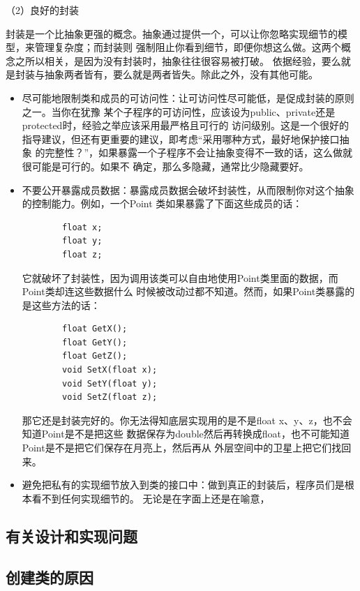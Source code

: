 \documentclass{article}
\begin{document}
\par
（2）良好的封装
\par
封装是一个比抽象更强的概念。抽象通过提供一个，可以让你忽略实现细节的模型，来管理复杂度；而封装则
强制阻止你看到细节，即便你想这么做。这两个概念之所以相关，是因为没有封装时，抽象往往很容易被打破。
依据经验，要么就是封装与抽象两者皆有，要么就是两者皆失。除此之外，没有其他可能。
\begin{itemize}
    \item 尽可能地限制类和成员的可访问性：让可访问性尽可能低，是促成封装的原则之一。当你在犹豫
    某个子程序的可访问性，应该设为public、private还是protected时，经验之举应该采用最严格且可行的
    访问级别。这是一个很好的指导建议，但还有更重要的建议，即考虑“采用哪种方式，最好地保护接口抽象
    的完整性？”，如果暴露一个子程序不会让抽象变得不一致的话，这么做就很可能是可行的。如果不
    确定，那么多隐藏，通常比少隐藏要好。
    \item 不要公开暴露成员数据：暴露成员数据会破坏封装性，从而限制你对这个抽象的控制能力。例如，一个Point
    类如果暴露了下面这些成员的话：
    \begin{lstlisting}
        float x;
        float y;
        float z;
    \end{lstlisting}
    它就破坏了封装性，因为调用该类可以自由地使用Point类里面的数据，而Point类却连这些数据什么
    时候被改动过都不知道。然而，如果Point类暴露的是这些方法的话：
    \begin{lstlisting}
        float GetX();
        float GetY();
        float GetZ();
        void SetX(float x);
        void SetY(float y);
        void SetZ(float z);
    \end{lstlisting}
    那它还是封装完好的。你无法得知底层实现用的是不是float x、y、z，也不会知道Point是不是把这些
    数据保存为double然后再转换成float，也不可能知道Point是不是把它们保存在月亮上，然后再从
    外层空间中的卫星上把它们找回来。
    \item 避免把私有的实现细节放入到类的接口中：做到真正的封装后，程序员们是根本看不到任何实现细节的。
    无论是在字面上还是在喻意，
\end{itemize}






\subsection{有关设计和实现问题}

\subsection{创建类的原因}
\end{document}
